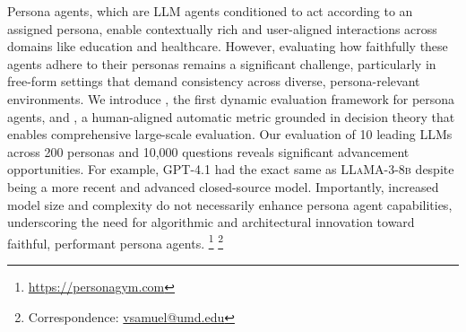 Persona agents, which are LLM agents conditioned to act according to an assigned persona, enable contextually rich and user-aligned interactions across domains like education and healthcare.
However, evaluating how faithfully these agents adhere to their personas remains a significant challenge, particularly in free-form settings that demand consistency across diverse, persona-relevant environments.
We introduce \benchmark, the first dynamic evaluation framework for persona agents, and \score, a human-aligned automatic metric grounded in decision theory that enables comprehensive large-scale evaluation. Our evaluation of 10 leading LLMs across 200 personas and 10,000 questions reveals significant advancement opportunities.
For example, \textsc{GPT-4.1} had the exact same \score as \textsc{LLaMA-3-8b} despite being a more recent and advanced closed-source model. Importantly, increased model size and complexity do not necessarily enhance persona agent capabilities, underscoring the need for algorithmic and architectural innovation toward faithful, performant persona agents. \footnote{\url{https://personagym.com}} \footnote{Correspondence: \href{mailto:vsamuel@umd.edu}{vsamuel@umd.edu}}
